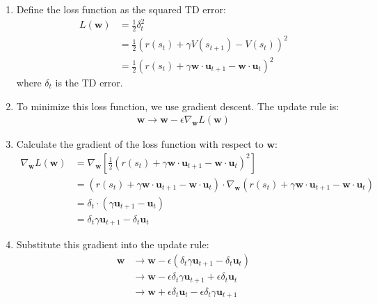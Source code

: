\documentclass{article}
\begin{document}
\begin{enumerate}
    \item Define the loss function as the squared TD error:
    \begin{align}
        L(\mathbf{w}) &= \frac{1}{2}\delta_t^2  \\
        &= \frac{1}{2}(r(s_t) + \gamma V(s_{t+1}) - V(s_t))^2 \\
        &= \frac{1}{2}(r(s_t) + \gamma \mathbf{w} \cdot \mathbf{u}_{t+1} - \mathbf{w} \cdot \mathbf{u}_t)^2 
    \end{align}
    where $\delta_t$ is the TD error.
    
    \item To minimize this loss function, we use gradient descent. The update rule is:
    \begin{align}
        \mathbf{w} \rightarrow \mathbf{w} - \epsilon \nabla_\mathbf{w} L(\mathbf{w})
    \end{align}
    
    \item Calculate the gradient of the loss function with respect to $\mathbf{w}$:
    \begin{align}
        \nabla_\mathbf{w} L(\mathbf{w}) &= \nabla_\mathbf{w} \left[\frac{1}{2}(r(s_t) + \gamma \mathbf{w} \cdot \mathbf{u}_{t+1} - \mathbf{w} \cdot \mathbf{u}_t)^2\right] \\
        &= (r(s_t) + \gamma \mathbf{w} \cdot \mathbf{u}_{t+1} - \mathbf{w} \cdot \mathbf{u}_t) \cdot \nabla_\mathbf{w}(r(s_t) + \gamma \mathbf{w} \cdot \mathbf{u}_{t+1} - \mathbf{w} \cdot \mathbf{u}_t) \\
        &= \delta_t \cdot (\gamma \mathbf{u}_{t+1} - \mathbf{u}_t) \\
        &= \delta_t \gamma \mathbf{u}_{t+1} - \delta_t \mathbf{u}_t
    \end{align}
    
    \item Substitute this gradient into the update rule:
    \begin{align}
        \mathbf{w} &\rightarrow \mathbf{w} - \epsilon (\delta_t \gamma \mathbf{u}_{t+1} - \delta_t \mathbf{u}_t) \\
        &\rightarrow \mathbf{w} - \epsilon \delta_t \gamma \mathbf{u}_{t+1} + \epsilon \delta_t \mathbf{u}_t \\
        &\rightarrow \mathbf{w} + \epsilon \delta_t \mathbf{u}_t - \epsilon \delta_t \gamma \mathbf{u}_{t+1}
    \end{align}
    

\end{enumerate}
\end{document}
